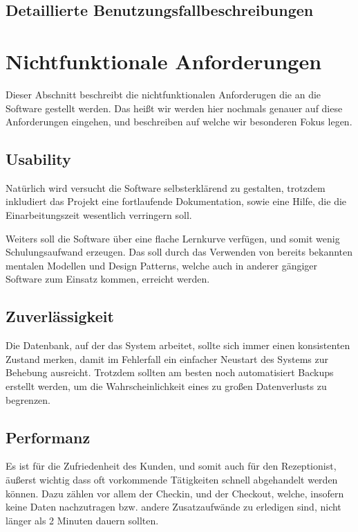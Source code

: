 \documentclass[10pt,a4paper,titlepage]{article}
\begin{document}
\subsection{Detaillierte Benutzungsfallbeschreibungen}
















\newpage

\section{Nichtfunktionale Anforderungen}
Dieser Abschnitt beschreibt die nichtfunktionalen Anforderugen die an die Software gestellt werden. Das heißt wir werden hier nochmals genauer auf diese Anforderungen eingehen, und beschreiben auf welche wir besonderen Fokus legen.
\subsection{Usability}
Natürlich wird versucht die Software selbsterklärend zu gestalten, trotzdem inkludiert das Projekt eine fortlaufende Dokumentation, sowie eine Hilfe, die die Einarbeitungszeit wesentlich verringern soll.

Weiters soll die Software über eine flache Lernkurve verfügen, und somit wenig Schulungsaufwand erzeugen. Das soll durch das Verwenden von bereits bekannten mentalen Modellen und Design Patterns, welche auch in anderer gängiger Software zum Einsatz kommen, erreicht werden.
\subsection{Zuverlässigkeit}
Die Datenbank, auf der das System arbeitet, sollte sich immer einen konsistenten Zustand merken, damit im Fehlerfall ein einfacher Neustart des Systems zur Behebung ausreicht. Trotzdem sollten am besten noch automatisiert Backups erstellt werden, um die Wahrscheinlichkeit eines zu großen Datenverlusts zu begrenzen.
\subsection{Performanz}
Es ist für die Zufriedenheit des \Gls{Kunde}n, und somit auch für den \Gls{Rezeptionist}, äußerst wichtig dass oft vorkommende Tätigkeiten schnell abgehandelt werden können. Dazu zählen vor allem der \Gls{Checkin}, und der \Gls{Checkout}, welche, insofern keine Daten nachzutragen bzw. andere Zusatzaufwände zu erledigen sind, nicht länger als 2 Minuten dauern sollten.
\end{document}
